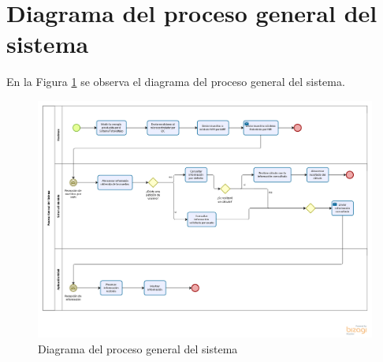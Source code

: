 \section{Diagrama del proceso general del sistema}
En la Figura \ref{fig:proceso_general} se observa el diagrama del proceso general del sistema.
\begin{figure}[H]
	\centering
	\includegraphics[scale=.48]{Capitulo4/images/procesoGeneral}
	\caption{Diagrama del proceso general del sistema}
	\label{fig:proceso_general}
\end{figure}


